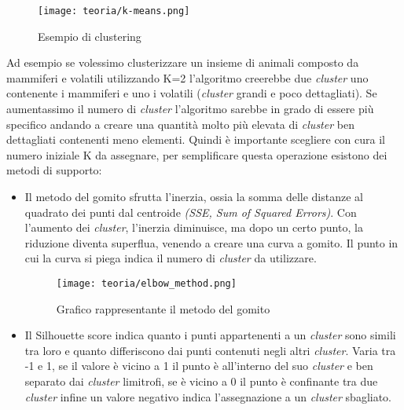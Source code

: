 \begin{figure}[!h] 
    \centering 
    \texttt{[image: teoria/k-means.png]} 
    \caption{Esempio di clustering}
    \label{fig:k-means}
  \end{figure}
Ad esempio se volessimo clusterizzare un insieme di animali composto da mammiferi e volatili utilizzando K=2 l'algoritmo creerebbe due \emph{cluster} uno contenente i mammiferi e uno i volatili  (\emph{cluster} grandi e poco dettagliati).
Se aumentassimo il numero di \emph{cluster} l'algoritmo sarebbe in grado di essere più specifico andando a creare una quantità molto più elevata di \emph{cluster} ben dettagliati contenenti meno elementi.
Quindi è importante scegliere con cura il numero iniziale K da assegnare, per semplificare questa operazione esistono dei metodi di supporto:
\begin{itemize}
    \item Il metodo del gomito sfrutta l’inerzia, ossia la somma delle distanze al quadrato dei punti dal centroide \emph{(SSE, Sum of Squared Errors)}. Con l'aumento dei \emph{cluster}, l’inerzia diminuisce, ma dopo un certo punto, la riduzione diventa superflua, venendo a creare una curva a gomito. Il punto in cui la curva si piega indica il numero di \emph{cluster} da utilizzare.
    
    \begin{figure}[!h] 
        \centering 
        \texttt{[image: teoria/elbow\_method.png]} 
        \caption{Grafico rappresentante il metodo del gomito}
        \label{fig:gomito}
      \end{figure}
    \newpage
    \item Il Silhouette score indica quanto i punti appartenenti a un \emph{cluster} sono simili tra loro e quanto differiscono dai punti contenuti negli altri \emph{cluster}.
    Varia tra -1 e 1, se il valore è vicino a 1 il punto è all'interno del suo \emph{cluster} e ben separato dai \emph{cluster} limitrofi, se è vicino a 0 il punto è confinante tra due \emph{cluster} infine un valore negativo indica l'assegnazione a un \emph{cluster} sbagliato.
\end{itemize}


